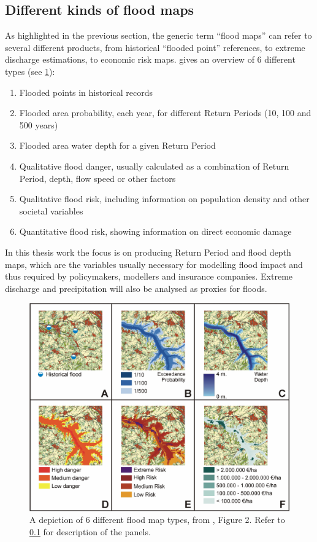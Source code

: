 \subsection{Different kinds of flood maps} \label{sec:flood_map_types}
As highlighted in the previous section, the generic term \enquote{flood maps} can refer to several different products, from historical ``flooded point'' references, to extreme discharge estimations, to economic risk maps. \citet{DeMoel2009} gives an overview of 6 different types (see \cref{fig:flood_map_types}):

\begin{enumerate}[label=\Alph*)] %
\item Flooded points in historical records
\item Flooded area probability, each year, for different Return Periods (10, 100 and 500 years)\label{enum:RP_map}
\item Flooded area water depth for a given Return Period
\item Qualitative flood danger, usually calculated as a combination of Return Period, depth, flow speed or other factors
\item Qualitative flood risk, including information on population density and other societal variables
\item Quantitative flood risk, showing information on direct economic damage
\end{enumerate}

In this thesis work the focus is on producing Return Period and flood depth maps, which are the variables usually necessary for modelling flood impact and thus required by policymakers, modellers and insurance companies. Extreme discharge and precipitation will also be analysed as proxies for floods.

\begin{figure}
    \centering
    \includegraphics[width=\textwidth]{figures/flood_map_types}
    \decoRule
    \caption[Flood map types]{A depiction of 6 different flood map types, from  \citet{DeMoel2009}, Figure 2. Refer to \cref{sec:flood_map_types} for description of the panels.}
    \label{fig:flood_map_types}
\end{figure}



